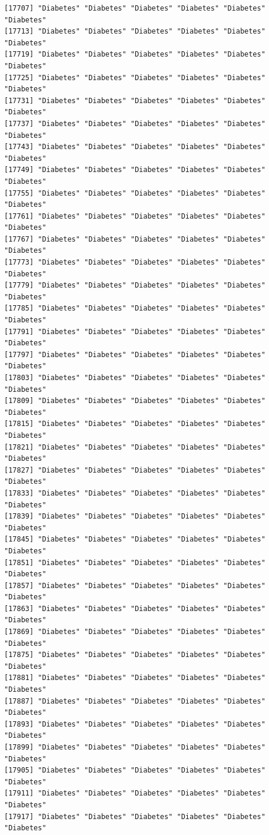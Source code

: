 \documentclass[
  letterpaper,
  DIV=11,
  numbers=noendperiod]{scrartcl}
\begin{document}
\begin{verbatim}
[17707] "Diabetes" "Diabetes" "Diabetes" "Diabetes" "Diabetes" "Diabetes"
[17713] "Diabetes" "Diabetes" "Diabetes" "Diabetes" "Diabetes" "Diabetes"
[17719] "Diabetes" "Diabetes" "Diabetes" "Diabetes" "Diabetes" "Diabetes"
[17725] "Diabetes" "Diabetes" "Diabetes" "Diabetes" "Diabetes" "Diabetes"
[17731] "Diabetes" "Diabetes" "Diabetes" "Diabetes" "Diabetes" "Diabetes"
[17737] "Diabetes" "Diabetes" "Diabetes" "Diabetes" "Diabetes" "Diabetes"
[17743] "Diabetes" "Diabetes" "Diabetes" "Diabetes" "Diabetes" "Diabetes"
[17749] "Diabetes" "Diabetes" "Diabetes" "Diabetes" "Diabetes" "Diabetes"
[17755] "Diabetes" "Diabetes" "Diabetes" "Diabetes" "Diabetes" "Diabetes"
[17761] "Diabetes" "Diabetes" "Diabetes" "Diabetes" "Diabetes" "Diabetes"
[17767] "Diabetes" "Diabetes" "Diabetes" "Diabetes" "Diabetes" "Diabetes"
[17773] "Diabetes" "Diabetes" "Diabetes" "Diabetes" "Diabetes" "Diabetes"
[17779] "Diabetes" "Diabetes" "Diabetes" "Diabetes" "Diabetes" "Diabetes"
[17785] "Diabetes" "Diabetes" "Diabetes" "Diabetes" "Diabetes" "Diabetes"
[17791] "Diabetes" "Diabetes" "Diabetes" "Diabetes" "Diabetes" "Diabetes"
[17797] "Diabetes" "Diabetes" "Diabetes" "Diabetes" "Diabetes" "Diabetes"
[17803] "Diabetes" "Diabetes" "Diabetes" "Diabetes" "Diabetes" "Diabetes"
[17809] "Diabetes" "Diabetes" "Diabetes" "Diabetes" "Diabetes" "Diabetes"
[17815] "Diabetes" "Diabetes" "Diabetes" "Diabetes" "Diabetes" "Diabetes"
[17821] "Diabetes" "Diabetes" "Diabetes" "Diabetes" "Diabetes" "Diabetes"
[17827] "Diabetes" "Diabetes" "Diabetes" "Diabetes" "Diabetes" "Diabetes"
[17833] "Diabetes" "Diabetes" "Diabetes" "Diabetes" "Diabetes" "Diabetes"
[17839] "Diabetes" "Diabetes" "Diabetes" "Diabetes" "Diabetes" "Diabetes"
[17845] "Diabetes" "Diabetes" "Diabetes" "Diabetes" "Diabetes" "Diabetes"
[17851] "Diabetes" "Diabetes" "Diabetes" "Diabetes" "Diabetes" "Diabetes"
[17857] "Diabetes" "Diabetes" "Diabetes" "Diabetes" "Diabetes" "Diabetes"
[17863] "Diabetes" "Diabetes" "Diabetes" "Diabetes" "Diabetes" "Diabetes"
[17869] "Diabetes" "Diabetes" "Diabetes" "Diabetes" "Diabetes" "Diabetes"
[17875] "Diabetes" "Diabetes" "Diabetes" "Diabetes" "Diabetes" "Diabetes"
[17881] "Diabetes" "Diabetes" "Diabetes" "Diabetes" "Diabetes" "Diabetes"
[17887] "Diabetes" "Diabetes" "Diabetes" "Diabetes" "Diabetes" "Diabetes"
[17893] "Diabetes" "Diabetes" "Diabetes" "Diabetes" "Diabetes" "Diabetes"
[17899] "Diabetes" "Diabetes" "Diabetes" "Diabetes" "Diabetes" "Diabetes"
[17905] "Diabetes" "Diabetes" "Diabetes" "Diabetes" "Diabetes" "Diabetes"
[17911] "Diabetes" "Diabetes" "Diabetes" "Diabetes" "Diabetes" "Diabetes"
[17917] "Diabetes" "Diabetes" "Diabetes" "Diabetes" "Diabetes" "Diabetes"

\end{verbatim}
\end{document}
